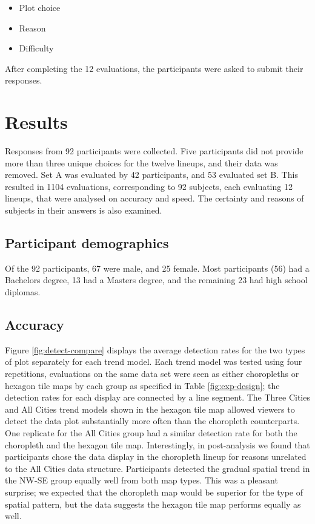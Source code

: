 \documentclass{monashthesis}
\begin{document}
\begin{itemize}
\tightlist
\item
  Plot choice
\item
  Reason
\item
  Difficulty
\end{itemize}

After completing the 12 evaluations, the participants were asked to submit their responses.

\hypertarget{results}{%
\section{Results}\label{results}}

Responses from 92 participants were collected. Five participants did not provide more than three unique choices for the twelve lineups, and their data was removed. Set A was evaluated by 42 participants, and 53 evaluated set B. This resulted in 1104 evaluations, corresponding to 92 subjects, each evaluating 12 lineups, that were analysed on accuracy and speed. The certainty and reasons of subjects in their answers is also examined.

\hypertarget{participant-demographics}{%
\subsection{Participant demographics}\label{participant-demographics}}

Of the 92 participants, 67 were male, and 25 female. Most participants (56) had a Bachelors degree, 13 had a Masters degree, and the remaining 23 had high school diplomas.

\hypertarget{accuracy}{%
\subsection{Accuracy}\label{accuracy}}

Figure \ref{fig:detect-compare} displays the average detection rates for the two types of plot separately for each trend model. Each trend model was tested using four repetitions, evaluations on the same data set were seen as either choropleths or hexagon tile maps by each group as specified in Table \ref{fig:exp-design}; the detection rates for each display are connected by a line segment. The Three Cities and All Cities trend models shown in the hexagon tile map allowed viewers to detect the data plot substantially more often than the choropleth counterparts.
One replicate for the All Cities group had a similar detection rate for both the choropleth and the hexagon tile map. Interestingly, in post-analysis we found that participants chose the data display in the choropleth lineup for reasons unrelated to the All Cities data structure.
Participants detected the gradual spatial trend in the NW-SE group equally well from both map types. This was a pleasant surprise; we expected that the choropleth map would be superior for the type of spatial pattern, but the data suggests the hexagon tile map performs equally as well.
\end{document}

